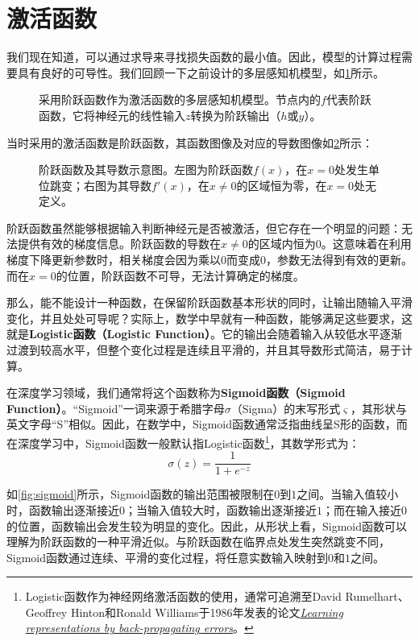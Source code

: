 \section{激活函数}

我们现在知道，可以通过求导来寻找损失函数的最小值。因此，模型的计算过程需要具有良好的可导性。我们回顾一下之前设计的多层感知机模型，如\cref{fig:mlp_step_function}所示。
\begin{figure}[H]
    \caption{采用阶跃函数作为激活函数的多层感知机模型。节点内的$f$代表阶跃函数，它将神经元的线性输入$z$转换为阶跃输出（$h$或$y$）。}
    \label{fig:mlp_step_function}
\end{figure}

当时采用的激活函数是阶跃函数，其函数图像及对应的导数图像如\cref{fig:step_function}所示：
\begin{figure}[H]
    \caption{阶跃函数及其导数示意图。左图为阶跃函数$f(x)$，在$x=0$处发生单位跳变；右图为其导数$f'(x)$，在$x \neq 0$的区域恒为零，在$x=0$处无定义。}
    \label{fig:step_function}
\end{figure}

阶跃函数虽然能够根据输入判断神经元是否被激活，但它存在一个明显的问题：无法提供有效的梯度信息。阶跃函数的导数在$x\neq0$的区域内恒为$0$。这意味着在利用梯度下降更新参数时，相关梯度会因为乘以$0$而变成$0$，参数无法得到有效的更新。而在$x=0$的位置，阶跃函数不可导，无法计算确定的梯度。  

那么，能不能设计一种函数，在保留阶跃函数基本形状的同时，让输出随输入平滑变化，并且处处可导呢？实际上，数学中早就有一种函数，能够满足这些要求，这就是\textbf{Logistic函数（Logistic Function）}。它的输出会随着输入从较低水平逐渐过渡到较高水平，但整个变化过程是连续且平滑的，并且其导数形式简洁，易于计算。

在深度学习领域，我们通常将这个函数称为\textbf{Sigmoid函数（Sigmoid Function）}。“Sigmoid”一词来源于希腊字母$\sigma$（Sigma）的末写形式$\varsigma$，其形状与英文字母“S”相似。因此，在数学中，Sigmoid函数通常泛指曲线呈S形的函数，而在深度学习中，Sigmoid函数一般默认指Logistic函数\footnote{Logistic函数作为神经网络激活函数的使用，通常可追溯至David Rumelhart、Geoffrey Hinton和Ronald Williams于1986年发表的论文\href{https://www.nature.com/articles/323533a0}{\textit{Learning representations by back-propagating errors}}。}，其数学形式为：
$$
\sigma(z)=\frac{1}{1+e^{-z}}
$$

如\cref{fig:sigmoid}所示，Sigmoid函数的输出范围被限制在$0$到$1$之间。当输入值较小时，函数输出逐渐接近$0$；当输入值较大时，函数输出逐渐接近$1$；而在输入接近$0$的位置，函数输出会发生较为明显的变化。因此，从形状上看，Sigmoid函数可以理解为阶跃函数的一种平滑近似。与阶跃函数在临界点处发生突然跳变不同，Sigmoid函数通过连续、平滑的变化过程，将任意实数输入映射到$0$和$1$之间。

